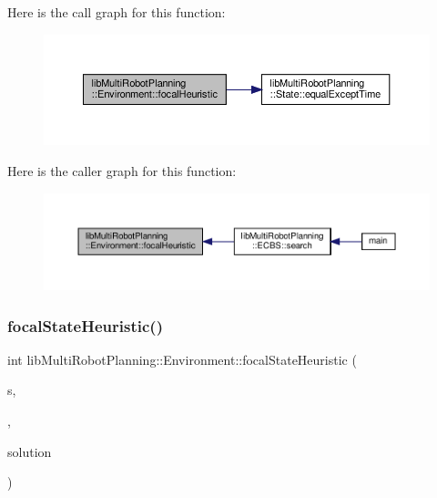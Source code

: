 Here is the call graph for this function\+:
\nopagebreak
\begin{figure}[H]
\begin{center}
\leavevmode
\includegraphics[width=350pt]{classlib_multi_robot_planning_1_1_environment_a7854e1df446e52051492b724c0416956_cgraph}
\end{center}
\end{figure}
Here is the caller graph for this function\+:
\nopagebreak
\begin{figure}[H]
\begin{center}
\leavevmode
\includegraphics[width=350pt]{classlib_multi_robot_planning_1_1_environment_a7854e1df446e52051492b724c0416956_icgraph}
\end{center}
\end{figure}
\mbox{\label{classlib_multi_robot_planning_1_1_environment_ac76b52b63f0bfbdde9dc6fed2520a0b6}} 
\subsubsection{\texorpdfstring{focal\+State\+Heuristic()}{focalStateHeuristic()}}
{\footnotesize\ttfamily int lib\+Multi\+Robot\+Planning\+::\+Environment\+::focal\+State\+Heuristic (\begin{DoxyParamCaption}\item[{const \hyperlink{structlib_multi_robot_planning_1_1_state}{State} \&}]{s,  }\item[{int}]{,  }\item[{const std\+::vector$<$ \hyperlink{structlib_multi_robot_planning_1_1_plan_result}{Plan\+Result}$<$ \hyperlink{structlib_multi_robot_planning_1_1_state}{State}, \hyperlink{namespacelib_multi_robot_planning_aba73fb71693f86a324adfa0e41e1053d}{Action}, int $>$ $>$ \&}]{solution }\end{DoxyParamCaption})\hspace{0.3cm}{\ttfamily [inline]}}



